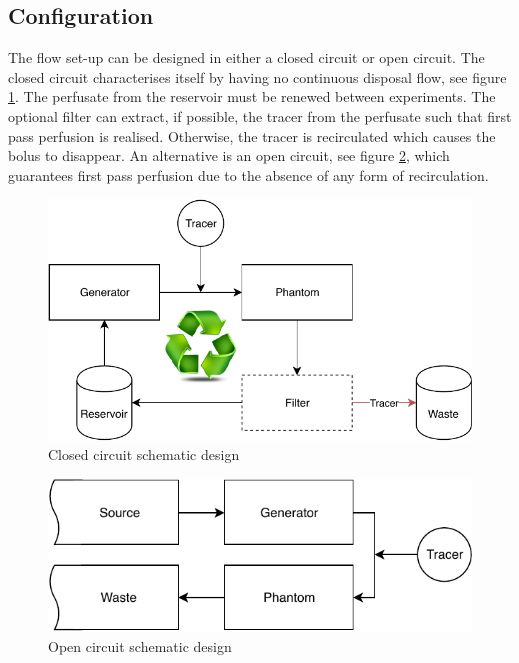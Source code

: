 \subsection*{Configuration}
\label{sec:config}
The flow set-up can be designed in either a closed circuit or open circuit. The closed circuit characterises itself by having no continuous disposal flow, see figure \ref{fig:closed_circ}. The perfusate from the reservoir must be renewed between experiments. The optional filter can extract, if possible, the tracer from the perfusate such that first pass perfusion is realised. Otherwise, the tracer is recirculated which causes the bolus to disappear. An alternative is an open circuit, see figure \ref{fig:open_circ}, which guarantees first pass perfusion due to the absence of any form of recirculation.
\begin{minipage}{0.5\textwidth}
\begin{figure}[H]
	\includegraphics[width=\linewidth]{./images/concept_design_closedCircuit.pdf}
	\caption{Closed circuit schematic design}
	\label{fig:closed_circ}
\end{figure}
\end{minipage}%
\begin{minipage}{0.5\textwidth}
\begin{figure}[H]
	\includegraphics[width=\linewidth]{./images/concept_design_openCircuit.pdf}
	\caption{Open circuit schematic design}
	\label{fig:open_circ}
\end{figure}
\end{minipage}
